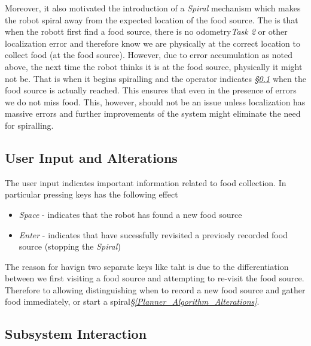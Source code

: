 \documentclass[11pt, a4paper]{article}
\begin{document}
Moreover, it also motivated the introduction of a \textit{Spiral} mechanism which makes the robot spiral away from the expected location of the food source. The is that when the robott first find a food source, there is no odometry\textit{Task 2}\cite{task2_report} or other localization error and therefore know we are physically at the correct location to collect food (at the food source). However, due to error accumulation as noted above, the next time the robot thinks it is at the food source, physically it might not be. That is when it begins spiralling and the operator indicates \textit{\S\ref{Planner_User_Input}}  when the food source is actually reached. This ensures that even in the presence of errors we do not miss food. This, however, should not be an issue unless localization has massive errors and further improvements of the system might eliminate the need for spiralling. 



\subsection{User Input and Alterations}
\label{Planner_User_Input}

The user input indicates important information related to food collection. In particular pressing keys has the following effect

\begin{itemize}

	\item \textit{Space} - indicates that the robot has found a new food source
	\item \textit{Enter} - indicates that have sucessfully revisited a previosly recorded food source (stopping the \textit{Spiral})

\end{itemize}

The reason for havign two separate keys like taht is due to the differentiation between we first visiting a food source and attempting to re-visit the food source. Therefore to allowing distinguishing when to record a new food source and gather food immediately, or start a spiral\textit{\S\ref{Planner_Algorithm_Alterations}}. 


\subsection{Subsystem Interaction}
\end{document}
